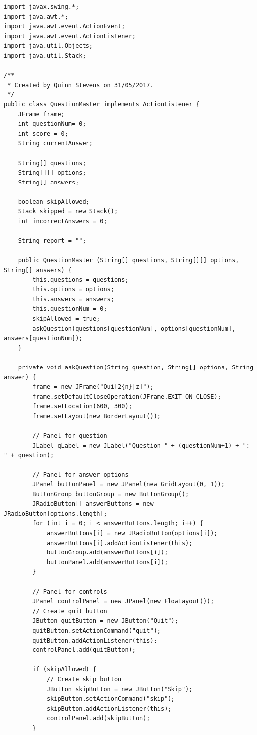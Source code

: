 \documentclass{report}
\begin{document}
\begin{verbatim}
import javax.swing.*;
import java.awt.*;
import java.awt.event.ActionEvent;
import java.awt.event.ActionListener;
import java.util.Objects;
import java.util.Stack;

/**
 * Created by Quinn Stevens on 31/05/2017.
 */
public class QuestionMaster implements ActionListener {
    JFrame frame;
    int questionNum= 0;
    int score = 0;
    String currentAnswer;

    String[] questions;
    String[][] options;
    String[] answers;

    boolean skipAllowed;
    Stack skipped = new Stack();
    int incorrectAnswers = 0;

    String report = "";

    public QuestionMaster (String[] questions, String[][] options, String[] answers) {
        this.questions = questions;
        this.options = options;
        this.answers = answers;
        this.questionNum = 0;
        skipAllowed = true;
        askQuestion(questions[questionNum], options[questionNum], answers[questionNum]);
    }

    private void askQuestion(String question, String[] options, String answer) {
        frame = new JFrame("Qui[2{n}|z]");
        frame.setDefaultCloseOperation(JFrame.EXIT_ON_CLOSE);
        frame.setLocation(600, 300);
        frame.setLayout(new BorderLayout());

        // Panel for question
        JLabel qLabel = new JLabel("Question " + (questionNum+1) + ": " + question);

        // Panel for answer options
        JPanel buttonPanel = new JPanel(new GridLayout(0, 1));
        ButtonGroup buttonGroup = new ButtonGroup();
        JRadioButton[] answerButtons = new JRadioButton[options.length];
        for (int i = 0; i < answerButtons.length; i++) {
            answerButtons[i] = new JRadioButton(options[i]);
            answerButtons[i].addActionListener(this);
            buttonGroup.add(answerButtons[i]);
            buttonPanel.add(answerButtons[i]);
        }

        // Panel for controls
        JPanel controlPanel = new JPanel(new FlowLayout());
        // Create quit button
        JButton quitButton = new JButton("Quit");
        quitButton.setActionCommand("quit");
        quitButton.addActionListener(this);
        controlPanel.add(quitButton);

        if (skipAllowed) {
            // Create skip button
            JButton skipButton = new JButton("Skip");
            skipButton.setActionCommand("skip");
            skipButton.addActionListener(this);
            controlPanel.add(skipButton);
        }


\end{verbatim}
\end{document}
